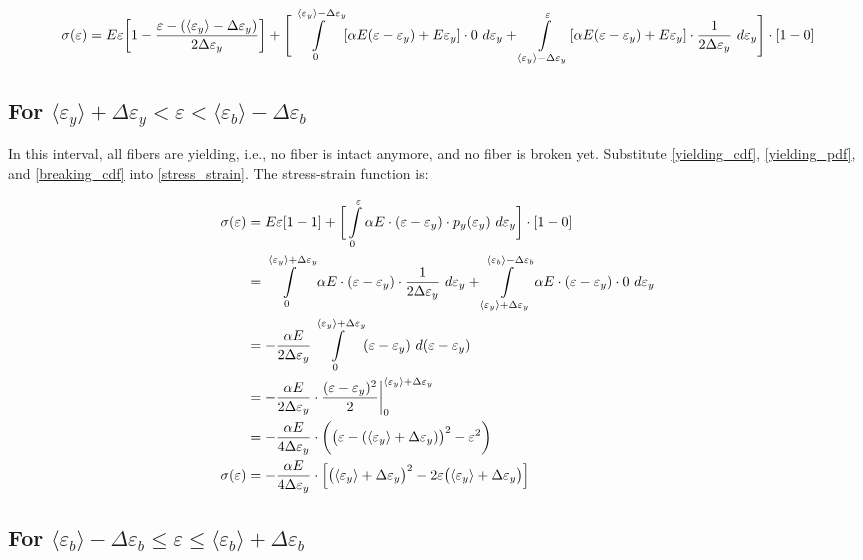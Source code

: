 \documentclass{article}
\newcommand{\eps}{\varepsilon}
\newcommand{\avg}[1]{\langle #1 \rangle}
\newcommand{\ey}{\avg{\eps_y}}
\newcommand{\dey}{\Delta \varepsilon_y}
\newcommand{\deb}{\Delta \varepsilon_b}
\begin{document}
\begin{align}
    \notag
    \sigma(\eps) &= E \eps \bigg[1 - \frac{\eps - (\ey - \dey)}{2 \dey} \bigg] + \Bigg[\int\limits_0^{\ey - \dey} [\alpha E (\eps - \eps_y) + E \eps_y] \cdot 0 ~ d\eps_y + \int\limits_{\ey - \dey}^\eps [\alpha E (\eps - \eps_y) + E \eps_y] \cdot \frac{1}{2 \dey} ~ d\eps_y \Bigg]\cdot [1 - 0] \\
\end{align}


\subsection{For $\avg{\eps_y} + \dey < \eps < \avg{\eps_b} - \deb$}

\indent
In this interval, all fibers are yielding, i.e., no fiber is intact anymore, and no fiber is broken yet. Substitute \eqref{yielding_cdf}, \eqref{yielding_pdf}, and \eqref{breaking_cdf} into \eqref{stress_strain}. The stress-strain function is:

\begin{align}
    \notag
    \sigma(\eps) &= E \eps [ 1 - 1 ] + \bigg[\int\limits_0^\eps \alpha E \cdot (\eps - \eps_y) \cdot p_y(\eps_y) ~ d\eps_y \bigg] \cdot [1 - 0] \\
    \notag
    &= \int\limits_0^{\avg{\eps_y} + \dey} \alpha E \cdot (\eps - \eps_y) \cdot \frac{1}{2 \dey} ~ d\eps_y + \int\limits_{\avg{\eps_y} + \dey}^{\avg{\eps_b} - \deb} \alpha E \cdot (\eps - \eps_y) \cdot 0 ~ d\eps_y  \\
    \notag
    &= - \frac{\alpha E}{2 \dey} \int\limits_0^{\avg{\eps_y} + \dey} (\eps - \eps_y) ~ d(\eps - \eps_y) \\
    \notag
    &= - \frac{\alpha E}{2 \dey} \cdot \frac{(\eps - \eps_y)^2}{2} \bigg|_0^{\avg{\eps_y} + \dey} \\
    \notag
    &= - \frac{\alpha E}{4 \dey} \cdot \bigg( \bigl( \eps - (\avg{\eps_y} + \dey)\bigr) ^2 - \eps^2 \bigg) \\
    \sigma(\eps) &= - \frac{\alpha E}{4 \dey} \cdot \Bigl[ \bigl( \avg{\eps_y} + \dey \bigr)^2 - 2\eps \bigl( \avg{\eps_y} + \dey \bigr) \Bigr]
\end{align}


\subsection{For $\avg{\eps_b} - \deb \leq \eps \leq \avg{\eps_b} + \deb$}
\end{document}
